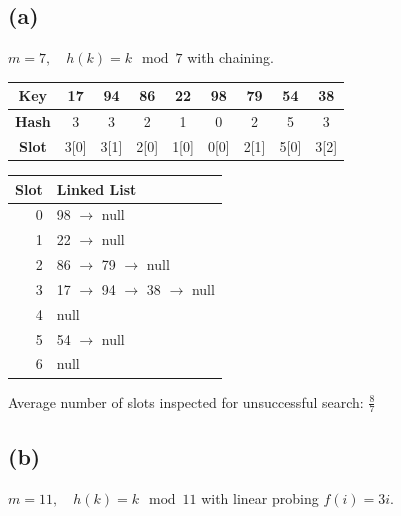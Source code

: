 \documentclass{article}
\begin{document}
\subsection*{(a)}

$m = 7,\quad h(k) = k \mod 7$ with chaining.

\begin{center}
    \begin{tabular}{|c|c|c|c|c|c|c|c|c|}
        \hline
        \textbf{Key}  & 17   & 94   & 86   & 22   & 98   & 79   & 54   & 38   \\
        \hline
        \textbf{Hash} & 3    & 3    & 2    & 1    & 0    & 2    & 5    & 3    \\
        \hline
        \textbf{Slot} & 3[0] & 3[1] & 2[0] & 1[0] & 0[0] & 2[1] & 5[0] & 3[2] \\
        \hline
    \end{tabular}
    \begin{tabular}{|r|l|}
        \hline
        \textbf{Slot} & \textbf{Linked List}            \\
        \hline
        0             & 98 $\to$ null                   \\
        1             & 22 $\to$ null                   \\
        2             & 86 $\to$ 79 $\to$ null          \\
        3             & 17 $\to$ 94 $\to$ 38 $\to$ null \\
        4             & null                            \\
        5             & 54 $\to$ null                   \\
        6             & null                            \\
        \hline
    \end{tabular}
\end{center}

Average number of slots inspected for unsuccessful search: $\frac{8}{7}$

\subsection*{(b)}

$m = 11,\quad h(k) = k \mod 11$ with linear probing $f(i) = 3i$.
\end{document}
